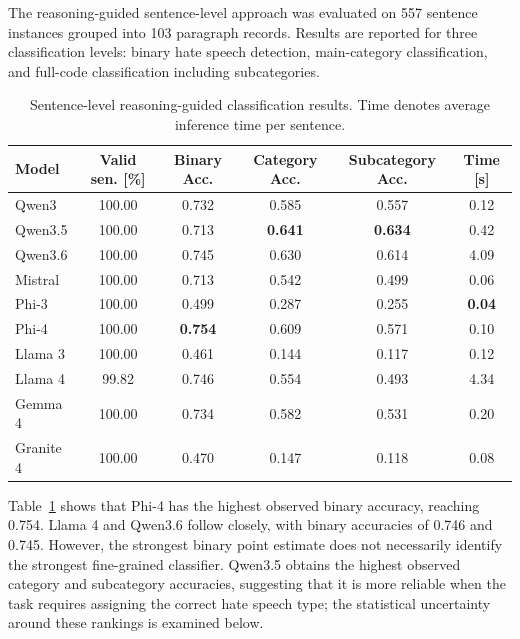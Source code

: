 \documentclass[a4paper]{article}
\begin{document}
The reasoning-guided sentence-level approach was evaluated on 557 sentence instances grouped into 103 paragraph records. Results are reported for three classification levels: binary hate speech detection, main-category classification, and full-code classification including subcategories.

\begin{table}[t]
\centering
\caption{Sentence-level reasoning-guided classification results. Time denotes average inference time per sentence.}
\label{tab:main_results}
\small
\renewcommand{\arraystretch}{1.20}
\setlength{\tabcolsep}{6pt}

\begin{tabular}{lccccc}
\toprule
\textbf{Model} & \textbf{Valid sen. [\%]} & \textbf{Binary Acc.} & \textbf{Category Acc.} & \textbf{Subcategory Acc.} & \textbf{Time [s]} \\
\midrule
Qwen3     & 100.00 & 0.732 & 0.585 & 0.557 & 0.12 \\
Qwen3.5   & 100.00 & 0.713 & \textbf{0.641} & \textbf{0.634} & 0.42 \\
Qwen3.6   & 100.00 & 0.745 & 0.630 & 0.614 & 4.09 \\
Mistral   & 100.00 & 0.713 & 0.542 & 0.499 & 0.06 \\
Phi-3     & 100.00 & 0.499 & 0.287 & 0.255 & \textbf{0.04} \\
Phi-4     & 100.00 & \textbf{0.754} & 0.609 & 0.571 & 0.10 \\
Llama 3   & 100.00 & 0.461 & 0.144 & 0.117 & 0.12 \\
Llama 4   & 99.82  & 0.746 & 0.554 & 0.493 & 4.34 \\
Gemma 4   & 100.00 & 0.734 & 0.582 & 0.531 & 0.20 \\
Granite 4 & 100.00 & 0.470 & 0.147 & 0.118 & 0.08 \\
\bottomrule
\end{tabular}
\end{table}

Table~\ref{tab:main_results} shows that Phi-4 has the highest observed binary accuracy, reaching 0.754. Llama 4 and Qwen3.6 follow closely, with binary accuracies of 0.746 and 0.745. However, the strongest binary point estimate does not necessarily identify the strongest fine-grained classifier. Qwen3.5 obtains the highest observed category and subcategory accuracies, suggesting that it is more reliable when the task requires assigning the correct hate speech type; the statistical uncertainty around these rankings is examined below.
\end{document}
